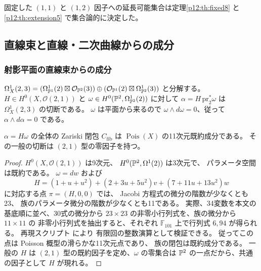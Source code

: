 \begin{remark}
固定した $(1,1)$ と $(1,2)$ 因子への延長可能集合は定理\ref{p12:th:fixed8} と\ref{p12:th:extension5} で集合論的に決定した。
\end{remark}


\subsection{直線束と直線・二次曲線からの成分}

\subsubsection{射影平面の直線束からの成分}
$\Omega^1_X(2,3)=
(\Omega^1_{\mathbb P^1}(2)\boxtimes\mathcal O_{\mathbb P^2}(3))
\oplus(\mathcal O_{\mathbb P^1}(2)\boxtimes\Omega^1_{\mathbb P^2}(3))$
と分解する。
$H\in H^0(X,\mathcal O(2,1))$ と
$\omega\in H^0(\mathbb P^2,\Omega^1_{\mathbb P^2}(2))$ に対して
$\alpha=H\,\mathrm{pr}_2^*\omega$ は $\Omega^1_X(2,3)$ の切断である。
$\omega$ は平面から来るので $\omega\wedge d\omega=0$、従って
$\alpha\wedge d\alpha=0$ である。
\begin{theorem}\label{p12:th:fibration}
$\alpha=H\omega$ の全体の Zariski 閉包
$C_{\mathrm{fib}}$ は $\operatorname{Pois}(X)$ の11次元既約成分である。
その一般の切断は $(2,1)$ 型の零因子を持つ。
\end{theorem}
\begin{proof}
$H^0(X,\mathcal O(2,1))$ は9次元、
$H^0(\mathbb P^2,\Omega^1(2))$ は3次元で、
パラメータ空間は既約である。
$\omega=dw$ および
\[
H=(1+u+u^2)+(2+3u+5u^2)v+(7+11u+13u^2)w
\]
に対応する点 $\pi=(H,0,0)$ では、
Jacobi 方程式の微分の階数が少なくとも23、
族のパラメータ微分の階数が少なくとも11である。
実際、34変数を本文の基底順に並べ、30式の微分から
$23\times23$ の非零小行列式を、族の微分から $11\times11$ の
非零小行列式を抽出すると、それぞれ
$\mathbb F_{101}$ 上で行列式 $6,94$ が得られる。
再現スクリプト  により
有限回の整数演算として検証できる。
従ってこの点は Poisson 概型の滑らかな11次元点であり、
族の閉包は既約成分である。
一般の $H$ は $(2,1)$ 型の既約因子を定め、$\omega$ の零集合は
$\mathbb P^2$ の一点だから、共通の因子として $H$ が現れる。
\end{proof}

